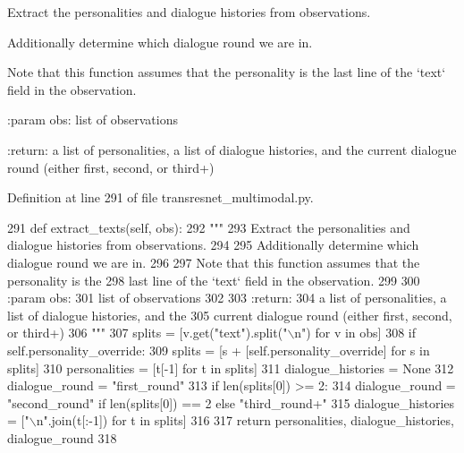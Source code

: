 \begin{DoxyVerb}Extract the personalities and dialogue histories from observations.

Additionally determine which dialogue round we are in.

Note that this function assumes that the personality is the
last line of the `text` field in the observation.

:param obs:
    list of observations

:return:
    a list of personalities, a list of dialogue histories, and the
    current dialogue round (either first, second, or third+)
\end{DoxyVerb}
 

Definition at line 291 of file transresnet\+\_\+multimodal.\+py.


\begin{DoxyCode}
291     \textcolor{keyword}{def }extract\_texts(self, obs):
292         \textcolor{stringliteral}{"""}
293 \textcolor{stringliteral}{        Extract the personalities and dialogue histories from observations.}
294 \textcolor{stringliteral}{}
295 \textcolor{stringliteral}{        Additionally determine which dialogue round we are in.}
296 \textcolor{stringliteral}{}
297 \textcolor{stringliteral}{        Note that this function assumes that the personality is the}
298 \textcolor{stringliteral}{        last line of the `text` field in the observation.}
299 \textcolor{stringliteral}{}
300 \textcolor{stringliteral}{        :param obs:}
301 \textcolor{stringliteral}{            list of observations}
302 \textcolor{stringliteral}{}
303 \textcolor{stringliteral}{        :return:}
304 \textcolor{stringliteral}{            a list of personalities, a list of dialogue histories, and the}
305 \textcolor{stringliteral}{            current dialogue round (either first, second, or third+)}
306 \textcolor{stringliteral}{        """}
307         splits = [v.get(\textcolor{stringliteral}{"text"}).split(\textcolor{stringliteral}{"\(\backslash\)n"}) \textcolor{keywordflow}{for} v \textcolor{keywordflow}{in} obs]
308         \textcolor{keywordflow}{if} self.personality\_override:
309             splits = [s + [self.personality\_override] \textcolor{keywordflow}{for} s \textcolor{keywordflow}{in} splits]
310         personalities = [t[-1] \textcolor{keywordflow}{for} t \textcolor{keywordflow}{in} splits]
311         dialogue\_histories = \textcolor{keywordtype}{None}
312         dialogue\_round = \textcolor{stringliteral}{"first\_round"}
313         \textcolor{keywordflow}{if} len(splits[0]) >= 2:
314             dialogue\_round = \textcolor{stringliteral}{"second\_round"} \textcolor{keywordflow}{if} len(splits[0]) == 2 \textcolor{keywordflow}{else} \textcolor{stringliteral}{"third\_round+"}
315             dialogue\_histories = [\textcolor{stringliteral}{"\(\backslash\)n"}.join(t[:-1]) \textcolor{keywordflow}{for} t \textcolor{keywordflow}{in} splits]
316 
317         \textcolor{keywordflow}{return} personalities, dialogue\_histories, dialogue\_round
318 
\end{DoxyCode}
